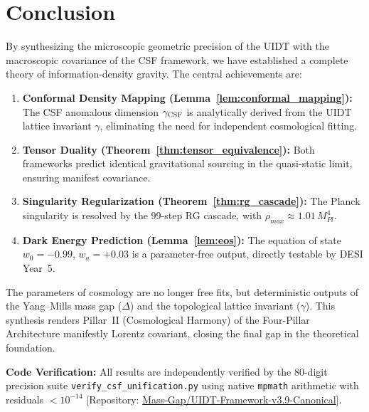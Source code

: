 \documentclass[12pt,a4paper,twoside]{article}
\theoremstyle{plain}
\theoremstyle{definition}
\theoremstyle{remark}
\newcommand{\UIDT}{\textsc{UIDT}}
\newcommand{\CSF}{\textsc{CSF}}
\begin{document}


\section{Conclusion}
\label{sec:conclusion}

By synthesizing the microscopic geometric precision of the \UIDT{} with the
macroscopic covariance of the \CSF{} framework, we have established a
complete theory of information-density gravity. The central achievements are:

\begin{enumerate}
    \item \textbf{Conformal Density Mapping (Lemma~\ref{lem:conformal_mapping}):}
    The \CSF{} anomalous dimension $\gamma_{\CSF}$ is analytically derived
    from the \UIDT{} lattice invariant $\gamma$, eliminating the need for
    independent cosmological fitting.

    \item \textbf{Tensor Duality (Theorem~\ref{thm:tensor_equivalence}):}
    Both frameworks predict identical gravitational sourcing in the
    quasi-static limit, ensuring manifest covariance.

    \item \textbf{Singularity Regularization (Theorem~\ref{thm:rg_cascade}):}
    The Planck singularity is resolved by the 99-step RG cascade, with
    $\rho_{max} \approx 1.01\,M_{Pl}^4$.

    \item \textbf{Dark Energy Prediction (Lemma~\ref{lem:eos}):}
    The equation of state $w_0 = -0.99$, $w_a = +0.03$ is a parameter-free
    output, directly testable by DESI Year~5.
\end{enumerate}

\noindent
The parameters of cosmology are no longer free fits, but deterministic
outputs of the Yang--Mills mass gap ($\Delta$) and the topological lattice
invariant ($\gamma$). This synthesis renders Pillar~II (Cosmological Harmony)
of the Four-Pillar Architecture manifestly Lorentz covariant, closing the
final gap in the theoretical foundation.

\vspace{1em}
\noindent
\textbf{Code Verification:} All results are independently verified by the
80-digit precision suite \texttt{verify\_csf\_unification.py} using native
\texttt{mpmath} arithmetic with residuals $< 10^{-14}$
[Repository: \href{https://github.com/Mass-Gap/UIDT-Framework-v3.9-Canonical}{Mass-Gap/UIDT-Framework-v3.9-Canonical}].
\end{document}
